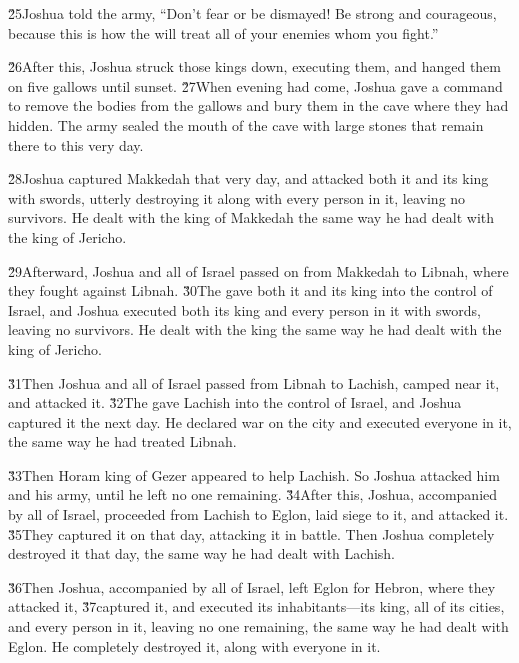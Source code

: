 \v{25}Joshua told the army, ``Don't fear or be dismayed! Be strong and courageous, because this is how the  will treat all of your enemies whom you fight.''

\v{26}After this, Joshua struck those kings down, executing them, and hanged them on five gallows until sunset. \v{27}When evening had come, Joshua gave a command to remove the bodies from the gallows and bury them in the cave where they had hidden. The army sealed the mouth of the cave with large stones that remain there to this very day.

\v{28}Joshua captured Makkedah that very day, and attacked both it and its king with swords, utterly destroying it along with every person in it, leaving no survivors. He dealt with the king of Makkedah the same way he had dealt with the king of Jericho.

\v{29}Afterward, Joshua and all of Israel passed on from Makkedah to Libnah, where they fought against Libnah. \v{30}The  gave both it and its king into the control of Israel, and Joshua executed both its king and every person in it with swords, leaving no survivors. He dealt with the king the same way he had dealt with the king of Jericho.

\v{31}Then Joshua and all of Israel passed from Libnah to Lachish, camped near it, and attacked it. \v{32}The  gave Lachish into the control of Israel, and Joshua captured it the next day. He declared war on the city and executed everyone in it, the same way he had treated Libnah.

\v{33}Then Horam king of Gezer appeared to help Lachish. So Joshua attacked him and his army, until he left no one remaining. \v{34}After this, Joshua, accompanied by all of Israel, proceeded from Lachish to Eglon, laid siege to it, and attacked it. \v{35}They captured it on that day, attacking it in battle. Then Joshua completely destroyed it that day, the same way he had dealt with Lachish.

\v{36}Then Joshua, accompanied by all of Israel, left Eglon for Hebron, where they attacked it, \v{37}captured it, and executed its inhabitants---its king, all of its cities, and every person in it, leaving no one remaining, the same way he had dealt with Eglon. He completely destroyed it, along with everyone in it.

